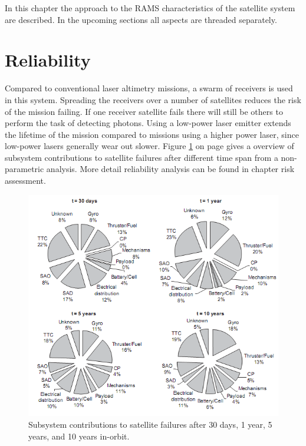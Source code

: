 
In this chapter the approach to the \ac{RAMS} characteristics of the satellite system are described. In the upcoming sections all aspects are threaded separately. 

\section{Reliability}
\label{blRAMSrel}
Compared to conventional laser altimetry missions, a swarm of receivers is used in this system. Spreading the receivers over a number of satellites reduces the risk of the mission failing. If one receiver satellite fails there will still be others to perform the task of detecting photons. Using a low-power laser emitter extends the lifetime of the mission compared to missions using a higher power laser, since low-power lasers generally wear out slower. Figure \ref{R} on page \pageref{R} gives a overview of subsystem contributions to satellite failures after different time span from a non-parametric analysis. More detail reliability analysis can be found in chapter risk assessment.
\begin{figure} [H]
	\begin{center}
         \includegraphics[width=1.0\textwidth,angle=0]{chapters/img/subsystem_reliability_analysis.png}
	
	\caption{Subsystem contributions to satellite failures after 30 days, 1 year, 5 years, and 10 years in-orbit.}
	\label{R}
	\end{center}
	\end{figure}

